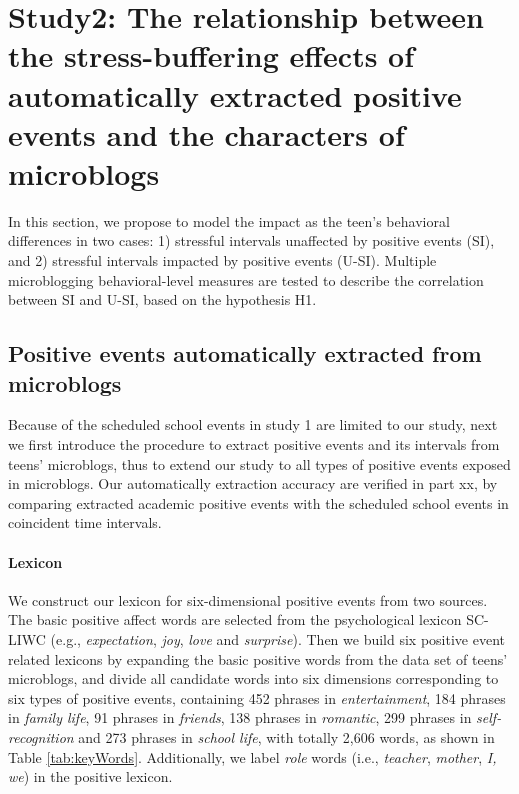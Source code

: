 
\section{Study2: The relationship between the stress-buffering effects of automatically extracted positive events and the characters of microblogs}
\label{partstudy2}
In this section,
we propose to model the impact as the teen's behavioral differences in two cases:
1) stressful intervals unaffected by positive events (SI),
and 2) stressful intervals impacted by positive events (U-SI).
Multiple microblogging behavioral-level measures are tested to describe the correlation between SI and U-SI,
based on the hypothesis H1.


\subsection{Positive events automatically extracted from microblogs}
Because of the scheduled school events in study 1 are limited to our study,
next we first introduce the procedure to extract positive events and its intervals from teens' microblogs,
thus to extend our study to all types of positive events exposed in microblogs.
Our automatically extraction accuracy are verified in part xx, by comparing extracted academic positive events with the scheduled school events in coincident time intervals.

\paragraph{Lexicon}
We construct our lexicon for six-dimensional positive events from two sources.
The basic positive affect words are selected from the psychological lexicon SC-LIWC (e.g., \emph{expectation}, \emph{joy}, \emph{love} and \emph{surprise})\cite{Tausczik2010The}.
Then we build six positive event related lexicons by expanding the basic positive words from the data set of teens' microblogs,
and divide all candidate words into six dimensions corresponding to six types of positive events,
containing 452 phrases in \emph{entertainment},
184 phrases in \emph{family life},
91 phrases in \emph{friends},
138 phrases in \emph{romantic},
299 phrases in \emph{self-recognition} and 273 phrases in \emph{school life}, with totally 2,606 words,
as shown in Table \ref{tab:keyWords}.
Additionally, we label \emph{role} words (i.e., \emph{teacher}, \emph{mother}, \emph{I, we}) in the positive lexicon.


